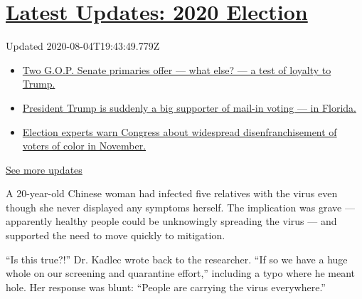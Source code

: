 \hypertarget{latest-updates-2020-election}{%
\section{\texorpdfstring{\href{https://www.nytimes3xbfgragh.onion/2020/08/04/us/elections/primary-election-michigan-arizona-kansas.html?action=click\&pgtype=Article\&state=default\&region=MAIN_CONTENT_1\&context=storylines_live_updates}{Latest
Updates: 2020
Election}}{Latest Updates: 2020 Election}}\label{latest-updates-2020-election}}

Updated 2020-08-04T19:43:49.779Z

\begin{itemize}
\tightlist
\item
  \href{https://www.nytimes3xbfgragh.onion/2020/08/04/us/elections/primary-election-michigan-arizona-kansas.html?action=click\&pgtype=Article\&state=default\&region=MAIN_CONTENT_1\&context=storylines_live_updates\#link-3924dd44}{Two
  G.O.P. Senate primaries offer --- what else? --- a test of loyalty to
  Trump.}
\item
  \href{https://www.nytimes3xbfgragh.onion/2020/08/04/us/elections/primary-election-michigan-arizona-kansas.html?action=click\&pgtype=Article\&state=default\&region=MAIN_CONTENT_1\&context=storylines_live_updates\#link-32b39e33}{President
  Trump is suddenly a big supporter of mail-in voting --- in Florida.}
\item
  \href{https://www.nytimes3xbfgragh.onion/2020/08/04/us/elections/primary-election-michigan-arizona-kansas.html?action=click\&pgtype=Article\&state=default\&region=MAIN_CONTENT_1\&context=storylines_live_updates\#link-6d019753}{Election
  experts warn Congress about widespread disenfranchisement of voters of
  color in November.}
\end{itemize}

\href{https://www.nytimes3xbfgragh.onion/2020/08/04/us/elections/primary-election-michigan-arizona-kansas.html?action=click\&pgtype=Article\&state=default\&region=MAIN_CONTENT_1\&context=storylines_live_updates}{See
more updates}

A 20-year-old Chinese woman had infected five relatives with the virus
even though she never displayed any symptoms herself. The implication
was grave --- apparently healthy people could be unknowingly spreading
the virus --- and supported the need to move quickly to mitigation.

``Is this true?!'' Dr. Kadlec wrote back to the researcher. ``If so we
have a huge whole on our screening and quarantine effort,'' including a
typo where he meant hole. Her response was blunt: ``People are carrying
the virus everywhere.''

